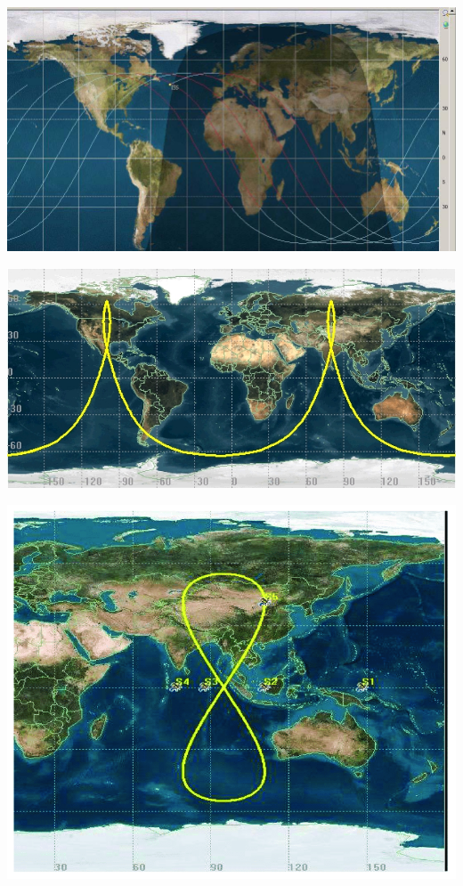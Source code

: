 \documentclass[12pt]{article}
\begin{document}
    \centering{}
    
    \includegraphics[width = \linewidth]{fa5b256a701ea9b325e312c87356208b.jpg}

    \includegraphics[width = \linewidth]{Molniya.jpg}

    \includegraphics[width = \linewidth]{Ground-track-of-CAPS-satellites-in-orbit.png}
\end{document}

